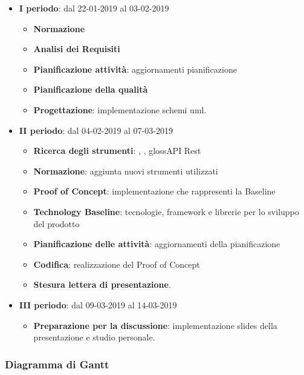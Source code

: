 		\begin{itemize}
			\item \textbf{I periodo}: dal 22-01-2019 al 03-02-2019
			\begin{itemize}
    	        \item \textbf{Normazione}
    	        \item \textbf{Analisi dei Requisiti}
    	        \item \textbf{Pianificazione attività}: aggiornamenti pianificazione
    	        \item \textbf{Pianificazione della qualità}
    	        \item \textbf{Progettazione}: implementazione schemi uml.
        	\end{itemize}
			\item \textbf{II periodo}: dal 04-02-2019 al 07-03-2019
			\begin{itemize}
				\item \textbf{Ricerca degli strumenti}: , , gloss{API Rest} 
    	        \item \textbf{Normazione}: aggiunta nuovi strumenti utilizzati
    	        \item \textbf{Proof of Concept}: implementazione che rappresenti la Baseline
    	        \item \textbf{Technology Baseline}: tecnologie, framework e librerie per lo sviluppo del prodotto
    	        \item \textbf{Pianificazione delle attività}: aggiornamenti della pianificazione
    	        \item \textbf{Codifica}: realizzazione del Proof of Concept
    	        \item \textbf{Stesura lettera di presentazione}.
        	\end{itemize}
        	\item \textbf{III periodo}: dal 09-03-2019 al 14-03-2019
			\begin{itemize}
				\item \textbf{Preparazione per la discussione}: implementazione slides della presentazione e studio personale.
        	\end{itemize}
		\end{itemize}
        
            \subsubsection{Diagramma di Gantt}


